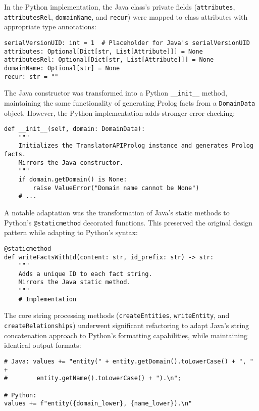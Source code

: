 \documentclass[12pt,a4paper]{article}
\begin{document}
In the Python implementation, the Java class's private fields (\texttt{attributes}, \texttt{attributesRel}, \texttt{domainName}, and \texttt{recur}) were mapped to class attributes with appropriate type annotations:

\begin{verbatim}
serialVersionUID: int = 1  # Placeholder for Java's serialVersionUID
attributes: Optional[Dict[str, List[Attribute]]] = None
attributesRel: Optional[Dict[str, List[Attribute]]] = None
domainName: Optional[str] = None
recur: str = ""
\end{verbatim}

The Java constructor was transformed into a Python \texttt{\_\_init\_\_} method, maintaining the same functionality of generating Prolog facts from a \texttt{DomainData} object. However, the Python implementation adds stronger error checking:

\begin{verbatim}
def __init__(self, domain: DomainData):
    """
    Initializes the TranslatorAPIProlog instance and generates Prolog facts.
    Mirrors the Java constructor.
    """
    if domain.getDomain() is None:
        raise ValueError("Domain name cannot be None")
    # ...
\end{verbatim}

A notable adaptation was the transformation of Java's static methods to Python's \texttt{@staticmethod} decorated functions. This preserved the original design pattern while adapting to Python's syntax:

\begin{verbatim}
@staticmethod
def writeFactsWithId(content: str, id_prefix: str) -> str:
    """
    Adds a unique ID to each fact string.
    Mirrors the Java static method.
    """
    # Implementation
\end{verbatim}

The core string processing methods (\texttt{createEntities}, \texttt{writeEntity}, and \texttt{createRelationships}) underwent significant refactoring to adapt Java's string concatenation approach to Python's formatting capabilities, while maintaining identical output formats:

\begin{verbatim}
# Java: values += "entity(" + entity.getDomain().toLowerCase() + ", " + 
#        entity.getName().toLowerCase() + ").\n";

# Python:
values += f"entity({domain_lower}, {name_lower}).\n"
\end{verbatim}
\end{document}
